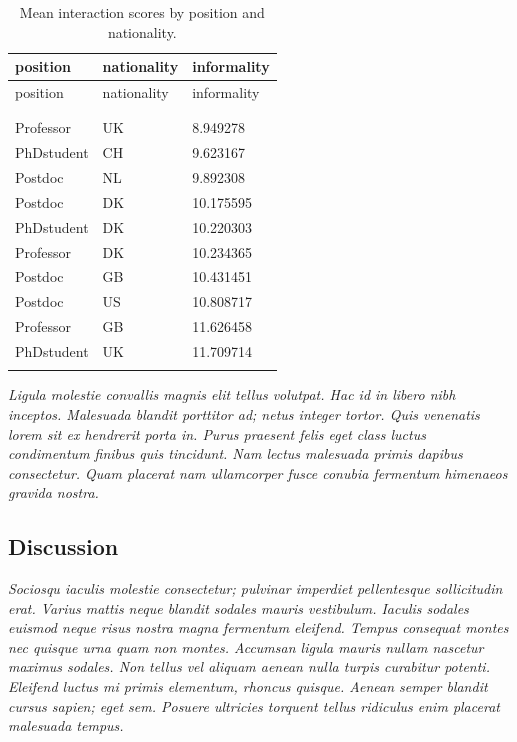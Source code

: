 \documentclass[
  a4paper,
]{scrbook}
\begin{document}
\begin{longtable}[]{@{}lll@{}}

\toprule\noalign{}
position & nationality & informality \\
\midrule\noalign{}
\endfirsthead
\toprule\noalign{}
position & nationality & informality \\
\midrule\noalign{}
\endhead
\bottomrule\noalign{}
\tabularnewline
\caption{}\label{T_fca36}\tabularnewline
\endlastfoot
Professor & UK & 8.949278 \\
PhDstudent & CH & 9.623167 \\
Postdoc & NL & 9.892308 \\
Postdoc & DK & 10.175595 \\
PhDstudent & DK & 10.220303 \\
Professor & DK & 10.234365 \\
Postdoc & GB & 10.431451 \\
Postdoc & US & 10.808717 \\
Professor & GB & 11.626458 \\
PhDstudent & UK & 11.709714 \\


\caption{\label{tbl-meaninformality}Mean interaction scores by position
and nationality.}

\tabularnewline
\end{longtable}

\emph{Ligula molestie convallis magnis elit tellus volutpat. Hac id in
libero nibh inceptos. Malesuada blandit porttitor ad; netus integer
tortor. Quis venenatis lorem sit ex hendrerit porta in. Purus praesent
felis eget class luctus condimentum finibus quis tincidunt. Nam lectus
malesuada primis dapibus consectetur. Quam placerat nam ullamcorper
fusce conubia fermentum himenaeos gravida nostra.}

\subsection{Discussion}\label{discussion}

\emph{Sociosqu iaculis molestie consectetur; pulvinar imperdiet
pellentesque sollicitudin erat. Varius mattis neque blandit sodales
mauris vestibulum. Iaculis sodales euismod neque risus nostra magna
fermentum eleifend. Tempus consequat montes nec quisque urna quam non
montes. Accumsan ligula mauris nullam nascetur maximus sodales. Non
tellus vel aliquam aenean nulla turpis curabitur potenti. Eleifend
luctus mi primis elementum, rhoncus quisque. Aenean semper blandit
cursus sapien; eget sem. Posuere ultricies torquent tellus ridiculus
enim placerat malesuada tempus.}
\end{document}
